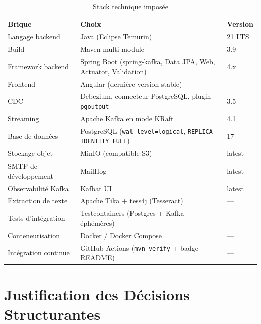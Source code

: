 \documentclass[12pt,a4paper,openany]{report}
\begin{document}
    \begin{table}[H]
    \centering
    \small
    \begin{tabularx}{\textwidth}{p{3.5cm}Xl}
    \toprule
    \textbf{Brique} & \textbf{Choix} & \textbf{Version} \\
    \midrule
    Langage backend        & Java (Eclipse Temurin)                                   & 21 LTS \\
    Build                  & Maven multi-module                                       & 3.9 \\
    Framework backend      & Spring Boot (spring-kafka, Data JPA, Web, Actuator, Validation) & 4.x \\
    Frontend               & Angular (derni\`ere version stable)                      & --- \\
    CDC                    & Debezium, connecteur PostgreSQL, plugin \texttt{pgoutput} & 3.5 \\
    Streaming              & Apache Kafka en mode KRaft                               & 4.1 \\
    Base de donn\'ees      & PostgreSQL (\texttt{wal\_level=logical}, \texttt{REPLICA IDENTITY FULL}) & 17 \\
    Stockage objet         & MinIO (compatible S3)                                    & latest \\
    SMTP de d\'eveloppement & MailHog                                                 & latest \\
    Observabilit\'e Kafka  & Kafbat UI                                                & latest \\
    Extraction de texte    & Apache Tika + tess4j (Tesseract)                         & --- \\
    Tests d'int\'egration  & Testcontainers (Postgres + Kafka \'eph\'em\`eres)        & --- \\
    Conteneurisation       & Docker / Docker Compose                                  & --- \\
    Int\'egration continue & GitHub Actions (\texttt{mvn verify} + badge README)      & --- \\
    \bottomrule
    \end{tabularx}
    \caption{Stack technique impos\'ee}
    \end{table}

    \section{Justification des D\'ecisions Structurantes}
\end{document}
